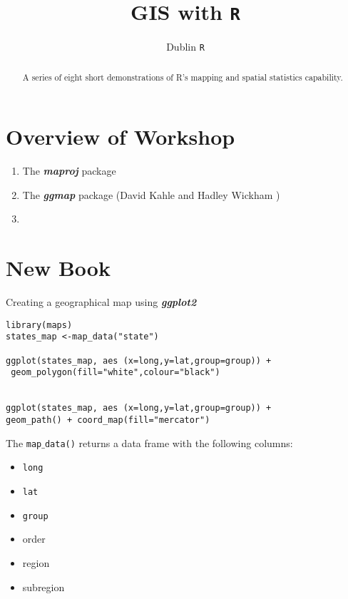 \documentclass[12pt]{article}
\title{GIS with \texttt{R}}
\author{Dublin \texttt{R}}
\begin{document}
\maketitle

\begin{abstract}
A series of eight short demonstrations of R's mapping and spatial statistics capability.
\end{abstract}
\newpage
\tableofcontents
\newpage
\section*{Overview of Workshop}
\begin{enumerate}
\item The \textit{\textbf{maproj}} package
\item The \textit{\textbf{ggmap}} package (David Kahle and Hadley Wickham )
\item 
\end{enumerate}

\newpage
\section{New Book}
Creating a geographical map using \textit{\textbf{ggplot2}}
\begin{framed}
\begin{verbatim}
library(maps)
states_map <-map_data("state")

ggplot(states_map, aes (x=long,y=lat,group=group)) +
 geom_polygon(fill="white",colour="black")


ggplot(states_map, aes (x=long,y=lat,group=group)) + 
geom_path() + coord_map(fill="mercator")

\end{verbatim}
\end{framed}

The \texttt{map$\_$data()} returns a data frame with the following columns:
\begin{itemize}
\item \texttt{long}
\item \texttt{lat}
\item \texttt{group}
\item order
\item region
\item subregion
\end{itemize}
\end{document}
